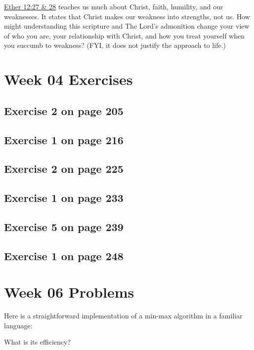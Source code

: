 \documentclass[12pt]{amsart}
\begin{document}
\href{https://www.lds.org/scriptures/bofm/ether/12.4}{Ether 12:27 \& 28} teaches us much about Christ, faith, humility, and our weaknesses. It states that Christ makes our weakness into strengths, not us. How might  understanding this scripture and The Lord\textquoteright s admonition \href{https://www.lds.org/scriptures/nt/luke/21.18-19?lang=eng&clang=eng#p17}{} change your view of who you are, your relationship with Christ, and how you treat yourself when you succumb to weakness? (FYI, it does not justify the  approach to life.)


 \section{Week 04 Exercises}
\subsection{ Exercise 2 on page 205} 
\subsection{ Exercise 1 on page 216} 
\subsection{Exercise 2 on page 225} 
\subsection{Exercise 1 on page 233} 
\subsection{Exercise 5 on page 239} 
\subsection{Exercise 1 on page 248}


\section{Week 06 Problems}

Here is a straightforward implementation of a min-max algorithm in a familiar
  language:

\lstset{language=C++}

  What is its efficiency?
\end{document}
